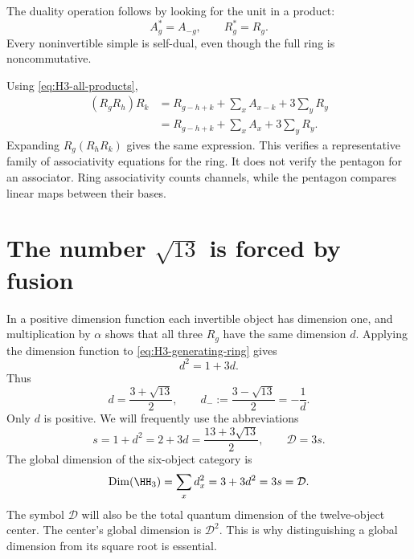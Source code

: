 The duality operation follows by looking for the unit in a product:
\begin{equation}
 A_g^*=A_{-g},\qquad R_g^*=R_g.
 \label{eq:H3-duals}
\end{equation}
Every noninvertible simple is self-dual, even though the full ring is
noncommutative.

\begin{example}
Using \eqref{eq:H3-all-products},
\begin{align*}
 (R_gR_h)R_k
 &=R_{g-h+k}+\sum_xA_{x-k}+3\sum_yR_y\\
 &=R_{g-h+k}+\sum_xA_x+3\sum_yR_y.
\end{align*}
Expanding $R_g(R_hR_k)$ gives the same expression.  This verifies a
representative family of associativity equations for the ring.
It does not verify the pentagon for an associator.  Ring associativity
counts channels, while the pentagon compares linear maps between
their bases.
\end{example}

\section{The number \texorpdfstring{$\sqrt{13}$}{sqrt(13)} is forced by fusion}

In a positive dimension function each invertible object has dimension
one, and multiplication by $\alpha$ shows that all three $R_g$ have
the same dimension $d$.  Applying the dimension function to
\eqref{eq:H3-generating-ring} gives
\[
 d^2=1+3d.
\]
Thus
\begin{equation}
 d=\frac{3+\sqrt{13}}2,\qquad
 d_-:=\frac{3-\sqrt{13}}2=-\frac1d.
 \label{eq:H3-dimension-roots}
\end{equation}
Only $d$ is positive.  We will frequently use the abbreviations
\begin{equation}
 s=1+d^2=2+3d=\frac{13+3\sqrt{13}}2,
 \qquad \mathcal D=3s.
 \label{eq:H3-s-D}
\end{equation}
The global dimension of the six-object category is
\begin{equation}
 \operatorname{Dim}(\HH_3)
 =\sum_x d_x^2=3+3d^2=3s=\mathcal D.
 \label{eq:H3-global-dimension}
\end{equation}
The symbol $\mathcal D$ will also be the total quantum dimension of
the twelve-object center.  The center's global dimension is
$\mathcal D^2$.  This is why distinguishing a global dimension from
its square root is essential.

